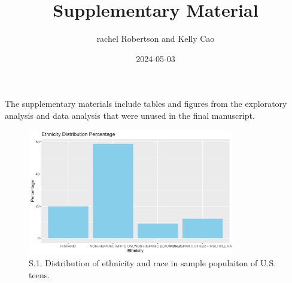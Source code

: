 \documentclass[
  letterpaper,
  DIV=11,
  numbers=noendperiod]{scrartcl}
\title{Supplementary Material}
\author{rachel Robertson and Kelly Cao}
\date{2024-05-03}
\begin{document}
\maketitle

The supplementary materials include tables and figures from the
exploratory analysis and data analysis that were unused in the final
manuscript.

\begin{figure}[H]

{\centering \includegraphics[width=0.8\textwidth,height=\textheight]{../../../results/figures/ethnicity.distribution.png}

}

\caption{S.1. Distribution of ethnicity and race in sample populaiton of
U.S. teens.}

\end{figure}%
\end{document}
